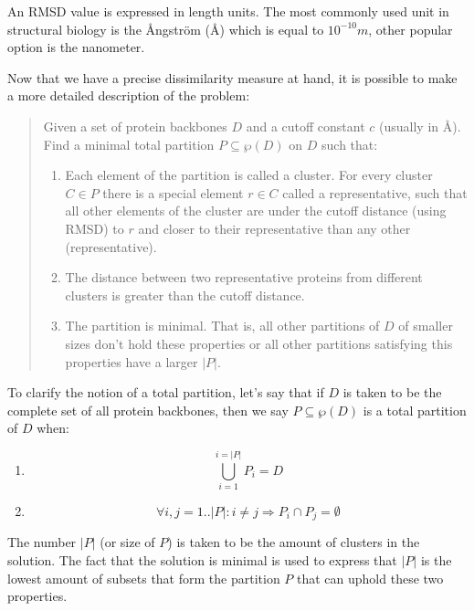 \documentclass[a4paper,12pt,english]{report}
\begin{document}
An RMSD value is expressed in length units. The most commonly used unit in structural biology is the \AA{}ngstr\"om (\AA{}) which is equal to $10^{-10}m$, other popular option is the nanometer\cite{proteins}.

Now that we have a precise dissimilarity measure at hand, it is possible to make a more detailed description of the problem:

\begin{quote}
Given a set of protein backbones $D$ and a cutoff constant $c$ (usually in \AA{}). Find a minimal total partition $P \subseteq \wp(D)$ on $D$ such that:
\begin{enumerate}
\item Each element of the partition is called a cluster. For every cluster $C \in P$ there is a special element $r \in C$ called a representative, such that all other elements of the cluster are under the cutoff distance (using RMSD) to $r$ and closer to their representative than any other (representative).
\item The distance between two representative proteins from different clusters is greater than the cutoff distance.
\item The partition is minimal. That is, all other partitions of $D$ of smaller sizes don't hold these properties or all other partitions satisfying this properties have a larger $\vert P \vert$.
\end{enumerate}
\end{quote}

To clarify the notion of a total partition, let's say that if $D$ is taken to be the complete set of all protein backbones, then we say $P \subseteq \wp(D)$ is a total partition of $D$ when:
\begin{enumerate}
\item \begin{displaymath}
        \bigcup_{i=1}^{i=\vert P \vert} P_{i} = D
      \end{displaymath}
\item \begin{displaymath}
        \forall i,j=1..\vert P \vert : i \neq j \Rightarrow P_{i} \cap P_{j} = \emptyset
      \end{displaymath}
\end{enumerate}

The number $\vert P \vert$ (or size of $P$) is taken to be the amount of clusters in the solution. The fact that the solution is minimal is used to express that $\vert P \vert$ is the lowest amount of subsets that form the partition $P$ that can uphold these two properties.
\end{document}
